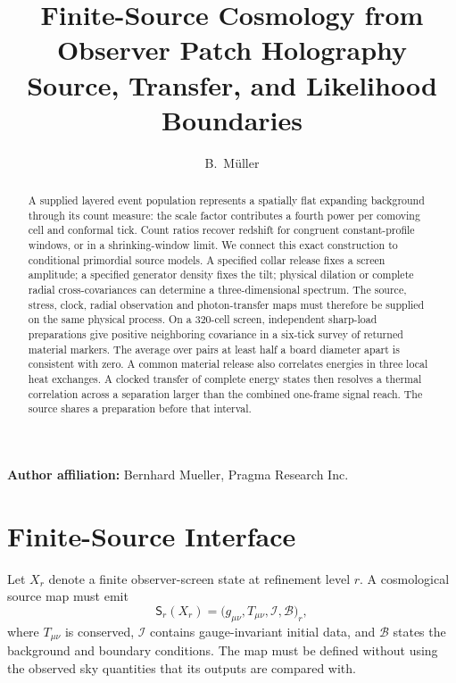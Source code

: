 \documentclass[11pt]{article}
\title{Finite-Source Cosmology from Observer Patch Holography\\
\large Source, Transfer, and Likelihood Boundaries}
\author{B.\ M\"uller}
\date{\OPHPaperReleaseDate}
\theoremstyle{remark}
\begin{document}
\maketitle
\OPHPaperReleaseBanner

\begin{center}
\small\textbf{Author affiliation:} Bernhard Mueller, Pragma Research Inc.
\end{center}

\begin{abstract}
A supplied layered event population represents a spatially flat expanding
background through its count measure: the scale factor contributes a fourth
power per comoving cell and conformal tick. Count ratios recover redshift
for congruent constant-profile windows, or in a shrinking-window limit.
We connect this exact construction to conditional primordial source models.
A specified collar release fixes a screen amplitude; a specified generator
density fixes the tilt; physical dilation or complete radial cross-covariances
can determine a three-dimensional spectrum. The source, stress, clock, radial observation and photon-transfer maps must
therefore be supplied on the same physical process. On a 320-cell screen, independent sharp-load preparations give positive
neighboring covariance in a six-tick survey of returned material markers.
The average over pairs at least half a board diameter apart is consistent
with zero. A common material release also correlates energies in three local heat exchanges.
A clocked transfer of complete energy states then resolves a thermal correlation across a separation larger than the combined one-frame signal reach. The source shares a preparation before that interval.

\end{abstract}



\section{Finite-Source Interface}

Let \(X_r\) denote a finite observer-screen state at refinement level \(r\).
A cosmological source map must emit
\begin{equation}
\mathsf S_r(X_r)
=\bigl(g_{\mu\nu},T_{\mu\nu},\mathcal I,\mathcal B\bigr)_r,
\label{eq:source-map}
\end{equation}
where \(T_{\mu\nu}\) is conserved, \(\mathcal I\) contains gauge-invariant
initial data, and \(\mathcal B\) states the background and boundary conditions.
The map must be defined without using the observed sky quantities that its
outputs are compared with.
\end{document}
